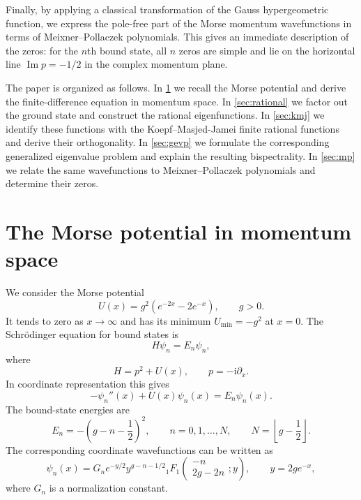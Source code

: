 \documentclass[11pt,reqno]{amsart}
\newcommand{\ii}{\mathrm{i}}
\newcommand{\floor}[1]{\left\lfloor #1\right\rfloor}
\numberwithin{equation}{section}
\begin{document}
Finally, by applying a classical transformation of the Gauss hypergeometric
function, we express the pole-free part of the Morse momentum wavefunctions in
terms of Meixner--Pollaczek polynomials.  This gives an immediate description of
the zeros: for the $n$th bound state, all $n$ zeros are simple and lie on the
horizontal line $\operatorname{Im} p=-1/2$ in the complex momentum plane.

The paper is organized as follows.  In \cref{sec:morse} we recall the Morse
potential and derive the finite-difference equation in momentum space.  In
\cref{sec:rational} we factor out the ground state and construct the rational
eigenfunctions.  In \cref{sec:kmj} we identify these functions with the
Koepf--Masjed-Jamei finite rational functions and derive their orthogonality.  In
\cref{sec:gevp} we formulate the corresponding generalized eigenvalue problem and
explain the resulting bispectrality.  In \cref{sec:mp} we relate the same
wavefunctions to Meixner--Pollaczek polynomials and determine their zeros.

\section{The Morse potential in momentum space}\label{sec:morse}

We consider the Morse potential
\begin{equation}
  U(x)=g^2\left(e^{-2x}-2e^{-x}\right),
  \qquad g>0.
  \label{eq:morse_potential}
\end{equation}
It tends to zero as $x\to\infty$ and has its minimum $U_{\min}=-g^2$ at $x=0$.
The Schr\"odinger equation for bound states is
\begin{equation}
  H\psi_n=E_n\psi_n,
  \label{eq:schrodinger_abstract}
\end{equation}
where
\begin{equation}
  H=p^2+U(x),
  \qquad p=-\ii\partial_x .
  \label{eq:hamiltonian}
\end{equation}
In coordinate representation this gives
\begin{equation}
  -\psi_n''(x)+U(x)\psi_n(x)=E_n\psi_n(x).
  \label{eq:coordinate_schrodinger}
\end{equation}
The bound-state energies are
\begin{equation}
  E_n=-\left(g-n-\frac12\right)^2,
  \qquad n=0,1,\dots,N,
  \qquad N=\floor{g-\frac12}.
  \label{eq:energies}
\end{equation}
The corresponding coordinate wavefunctions can be written as
\begin{equation}
  \psi_n(x)=G_n e^{-y/2} y^{g-n-1/2}
  {}_1F_1\!\left(
  \begin{matrix}-n\\ 2g-2n\end{matrix};y
  \right),
  \qquad y=2g e^{-x},
  \label{eq:coordinate_wavefunctions}
\end{equation}
where $G_n$ is a normalization constant.
\end{document}
